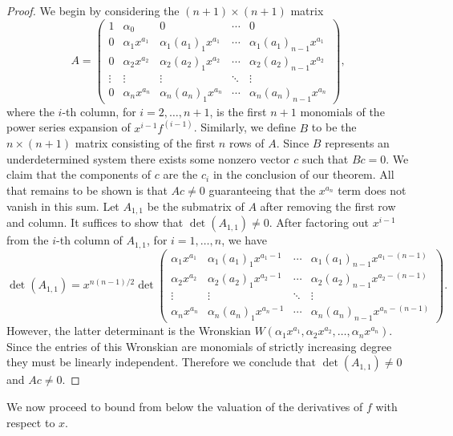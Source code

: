 \documentclass{amsart}
\theoremstyle{definition}
\theoremstyle{remark}
\numberwithin{equation}{section}
\begin{document}
\begin{proof}
We begin by considering the $(n+1)\times (n+1)$ matrix
\[
A  = \begin{pmatrix}
1 & \alpha_0 & 0 & \cdots & 0\\
0 & \alpha_1 x^{a_1} & \alpha_1 (a_1)_1 x^{a_1} & \cdots & \alpha_1 (a_1)_{n-1} x^{a_1}\\
0 & \alpha_2 x^{a_2} & \alpha_2 (a_2)_1 x^{a_2} & \cdots & \alpha_2 (a_2)_{n-1} x^{a_2}\\
\vdots & \vdots & \vdots & \ddots & \vdots\\
0 & \alpha_n x^{a_n} & \alpha_n (a_n)_1 x^{a_n} & \cdots & \alpha_n (a_n)_{n-1} x^{a_n}
\end{pmatrix},
\]
where the $i$-th column, for $i=2, \ldots, n+1$, is the first $n+1$ monomials of the power series expansion of $x^{i-1} f^{(i-1)}$. Similarly, we define $B$ to be the $n\times (n+1)$ matrix consisting of the first $n$ rows of $A$. Since $B$ represents an underdetermined system there exists some nonzero vector $c$ such that $Bc = 0$. We claim that the components of $c$ are the $c_i$ in the conclusion of our theorem. All that remains to be shown is that $Ac \neq 0$ guaranteeing that the $x^{a_n}$ term does not vanish in this sum. Let $A_{1,1}$ be the submatrix of $A$ after removing the first row and column. It suffices to show that $\det(A_{1,1}) \neq 0$. After factoring out $x^{i-1}$ from the $i$-th column of $A_{1,1}$, for $i=1, \ldots, n$, we have
\[
\det(A_{1,1}) = x^{n(n-1)/2} \det \begin{pmatrix}
\alpha_1 x^{a_1} & \alpha_1 (a_1)_1 x^{a_1-1} & \cdots & \alpha_1 (a_1)_{n-1} x^{a_1-(n-1)}\\
\alpha_2 x^{a_2} & \alpha_2 (a_2)_1 x^{a_2-1} & \cdots & \alpha_2 (a_2)_{n-1} x^{a_2-(n-1)}\\
\vdots & \vdots & \ddots & \vdots\\
\alpha_n x^{a_n} & \alpha_n (a_n)_1 x^{a_n-1} & \cdots & \alpha_n (a_n)_{n-1} x^{a_n-(n-1)}
\end{pmatrix}.
\]
However, the latter determinant is the Wronskian $W(\alpha_1 x^{a_1},\alpha_2 x^{a_2}, \ldots, \alpha_n x^{a_n})$. Since the entries of this Wronskian are monomials of strictly increasing degree they must be linearly independent. Therefore we conclude that $\det(A_{1,1})\neq 0$ and $Ac\neq 0$.
\end{proof}

We now proceed to bound from below the valuation of the derivatives of $f$ with respect to $x$.
\end{document}
